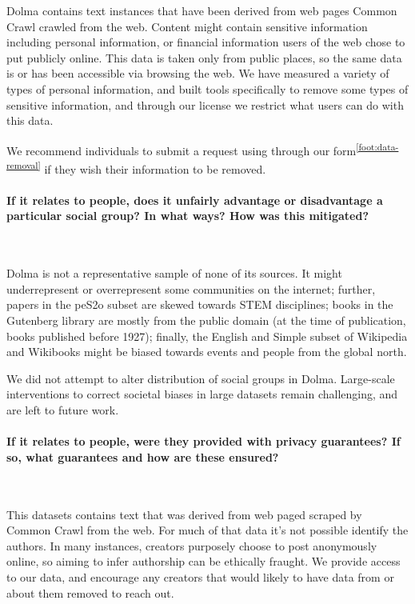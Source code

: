 \documentclass{article}
\newcommand{\dolma}{Dolma\xspace}
\newcommand*{\fnref}[1]{\textsuperscript{\ref{#1}}}
\begin{document}
\dolma contains text instances that have been derived from web pages Common Crawl crawled from the web. 
Content might contain sensitive information including personal information, or financial information users of the web chose to put publicly online. 
This data is taken only from public places, so the same data is or has been accessible via browsing the web. 
We have measured a variety of types of personal information, and built tools specifically to remove some types of sensitive information, and through our license we restrict what users can do with this data. 

We recommend individuals to submit a request using through our form\fnref{foot:data-removal} if they wish their information to be removed. 

\paragraph{If it relates to people, does it unfairly advantage or disadvantage a particular social group? In what ways? How was this mitigated?}~

\dolma is not a representative sample of none of its sources. 
It might underrepresent or overrepresent some communities on the internet;
further, papers in the peS2o subset are skewed towards STEM disciplines;
books in the Gutenberg library are mostly from the public domain (at the time of publication, books published before 1927);
finally, the English and Simple subset of Wikipedia and Wikibooks might be biased towards events and people from the global north.

We did not attempt to alter distribution of social groups in \dolma. 
Large-scale interventions to correct societal biases in large datasets remain challenging, and are left to future work.

\paragraph{If it relates to people, were they provided with privacy guarantees? If so, what guarantees and how are these ensured?}~

This datasets contains text that was derived from web paged scraped by Common Crawl from the web. 
For much of that data it’s not possible identify the authors. 
In many instances, creators purposely choose to post anonymously online, so aiming to infer authorship can be ethically fraught. We provide access to our data, and encourage any creators that would likely to have data from or about them removed to reach out.
\end{document}
